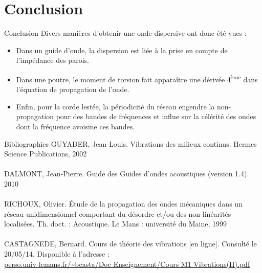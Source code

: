 \documentclass[xcolor=x11names,compress]{beamer}
\renewcommand{\(}{\begin{columns}}
\renewcommand{\)}{\end{columns}}
\newcommand{\<}[1]{\begin{column}{#1}}
\renewcommand{\>}{\end{column}}
\begin{document}
\section{Conclusion}
\begin{frame}{Conclusion}
Divers manières d'obtenir une onde dispersive ont donc été vues :

\begin{itemize}
\item Dans un guide d'onde, la dispersion est liée à la prise en compte de l'impédance des parois.
\bigskip
\item Dans une poutre, le moment de torsion fait apparaître une dérivée 4\textsuperscript{ème} dans l'équation de propagation de l'onde.
\bigskip
\item Enfin, pour la corde lestée, la périodicité du réseau engendre la non-propagation pour des bandes de fréquences et influe sur la célérité des ondes dont la fréquence avoisine ces bandes.

\end{itemize}


\end{frame}

\begin{frame}{Bibliographies}
\indent GUYADER, Jean-Louis. Vibrations des milieux continus. Hermes Science Publications, 2002 \\~\\
\indent DALMONT, Jean-Pierre. Guide des Guides d'ondes acoustiques (version 1.4). 2010 \\ ~\\
\indent RICHOUX, Olivier. Étude de la propagation des ondes mécaniques dans un réseau unidimensionnel comportant du désordre et/ou des non-linéarités localisées. Th. doct. : Acoustique. Le Mans : université du Maine, 1999 \\~\\

\indent CASTAGNEDE, Bernard. Cours de théorie des vibrations [en ligne]. Consulté le 20/05/14. Disponible à l'adresse : \\ \url{perso.univ-lemans.fr/~bcasta/Doc Enseignement/Cours M1 Vibrations(II).pdf}


\end{frame}
\end{document}
